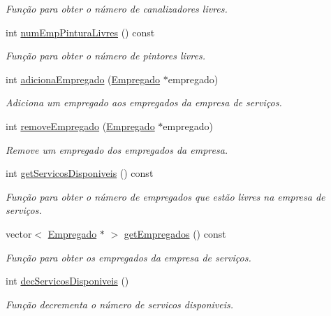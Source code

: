 \begin{DoxyCompactItemize}
\begin{DoxyCompactList}\small\item\em Função para obter o número de canalizadores livres. \end{DoxyCompactList}\item 
int \hyperlink{class_servico_a83583e1dca00f51715e03a1f33818494}{num\+Emp\+Pintura\+Livres} () const 
\begin{DoxyCompactList}\small\item\em Função para obter o número de pintores livres. \end{DoxyCompactList}\item 
int \hyperlink{class_servico_a6e3eb546bad5975cf8e678ae4e6f6ea3}{adiciona\+Empregado} (\hyperlink{class_empregado}{Empregado} $\ast$empregado)
\begin{DoxyCompactList}\small\item\em Adiciona um empregado aos empregados da empresa de serviços. \end{DoxyCompactList}\item 
int \hyperlink{class_servico_af2d0e60b4f9b4c1a3e9c545d00a87659}{remove\+Empregado} (\hyperlink{class_empregado}{Empregado} $\ast$empregado)
\begin{DoxyCompactList}\small\item\em Remove um empregado dos empregados da empresa. \end{DoxyCompactList}\item 
int \hyperlink{class_servico_a1a9fbbe6413835ba366355cc4131c413}{get\+Servicos\+Disponiveis} () const 
\begin{DoxyCompactList}\small\item\em Função para obter o número de empregados que estão livres na empresa de serviços. \end{DoxyCompactList}\item 
vector$<$ \hyperlink{class_empregado}{Empregado} $\ast$ $>$ \hyperlink{class_servico_a9d7003d0cc174b05ee16b329d4c96b44}{get\+Empregados} () const 
\begin{DoxyCompactList}\small\item\em Função para obter os empregados da empresa de serviços. \end{DoxyCompactList}\item 
int \hyperlink{class_servico_a61f4dc0bff250f3be3c23b495c2b0e91}{dec\+Servicos\+Disponiveis} ()
\begin{DoxyCompactList}\small\item\em Função decrementa o número de servicos disponiveis. \end{DoxyCompactList}\item 

\end{DoxyCompactItemize}
